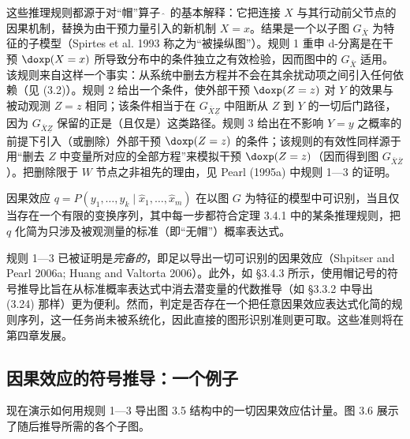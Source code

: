 这些推理规则都源于对“帽”算子 $\hat{\ }$ 的基本解释：它把连接 $X$ 与其行动前父节点的因果机制，替换为由干预力量引入的新机制 $X=x$。结果是一个以子图 $G_{\bar{X}}$ 为特征的子模型（Spirtes et al. 1993 称之为“被操纵图”）。规则 1 重申 d-分离是在干预 $\doxp(X=x)$ 所导致分布中的条件独立之有效检验，因而图中的 $G_{\bar{X}}$ 适用。该规则来自这样一个事实：从系统中删去方程并不会在其余扰动项之间引入任何依赖（见 \textup{(3.2)}）。规则 2 给出一个条件，使外部干预 $\doxp(Z=z)$ 对 $Y$ 的效果与被动观测 $Z=z$ 相同；该条件相当于在 $G_{\bar{X}\underline{Z}}$ 中阻断从 $Z$ 到 $Y$ 的一切后门路径，因为 $G_{\bar{X}\underline{Z}}$ 保留的正是（且仅是）这类路径。规则 3 给出在不影响 $Y=y$ 之概率的前提下引入（或删除）外部干预 $\doxp(Z=z)$ 的条件；该规则的有效性同样源于用“删去 $Z$ 中变量所对应的全部方程”来模拟干预 $\doxp(Z=z)$（因而得到图 $G_{\bar{X}\overline{Z}}$）。把删除限于 $W$ 节点之非祖先的理由，见 Pearl (1995a) 中规则 1—3 的证明。

\begin{corollary}
因果效应 $q=P(y_1,\dots,y_k\mid\hat{x}_1,\dots,\hat{x}_m)$ 在以图 $G$ 为特征的模型中可识别，当且仅当存在一个有限的变换序列，其中每一步都符合定理 3.4.1 中的某条推理规则，把 $q$ 化简为只涉及被观测量的标准（即“无帽”）概率表达式。
\end{corollary}

规则 1—3 已被证明是\emph{完备的}，即足以导出一切可识别的因果效应（Shpitser and Pearl 2006a; Huang and Valtorta 2006）。此外，如 \S 3.4.3 所示，使用帽记号的符号推导比旨在从标准概率表达式中消去潜变量的代数推导（如 \S 3.3.2 中导出 \textup{(3.24)} 那样）更为便利。然而，判定是否存在一个把任意因果效应表达式化简的规则序列，这一任务尚未被系统化，因此直接的图形识别准则更可取。这些准则将在第四章发展。

\subsection{因果效应的符号推导：一个例子}

现在演示如何用规则 1—3 导出图 3.5 结构中的一切因果效应估计量。图 3.6 展示了随后推导所需的各个子图。


